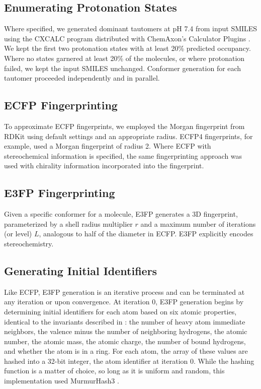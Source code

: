 \documentclass[../../main.tex]{subfiles}
\begin{document}
\begin{refsection}
	\subsection*{Enumerating Protonation States}

	Where specified, we generated dominant tautomers at pH 7.4 from input SMILES using the CXCALC program distributed with ChemAxon's Calculator Plugins \supercite{chemaxon_software_2015}.
	We kept the first two protonation states with at least 20\% predicted occupancy.
	Where no states garnered at least 20\% of the molecules, or where protonation failed, we kept the input SMILES unchanged.
	Conformer generation for each tautomer proceeded independently and in parallel.

	\subsection*{ECFP Fingerprinting}

	To approximate ECFP fingerprints, we employed the Morgan fingerprint from RDKit using default settings and an appropriate radius.
	ECFP4 fingerprints, for example, used a Morgan fingerprint of radius 2.
	Where ECFP with stereochemical information is specified, the same fingerprinting approach was used with chirality information incorporated into the fingerprint.

	\subsection*{E3FP Fingerprinting}

	Given a specific conformer for a molecule, E3FP generates a 3D fingerprint, parameterized by a shell radius multiplier $r$ and a maximum number of iterations (or level) $L$, analogous to half of the diameter in ECFP.
	E3FP explicitly encodes stereochemistry.

	\subsection*{Generating Initial Identifiers}

	Like ECFP, E3FP generation is an iterative process and can be terminated at any iteration or upon convergence.
	At iteration 0, E3FP generation begins by determining initial identifiers for each atom based on six atomic properties, identical to the invariants described in  \supercite{rogers_2010} : the number of heavy atom immediate neighbors, the valence minus the number of neighboring hydrogens, the atomic number, the atomic mass, the atomic charge, the number of bound hydrogens, and whether the atom is in a ring.
	For each atom, the array of these values are hashed into a 32-bit integer, the atom identifier at iteration 0.
	While the hashing function is a matter of choice, so long as it is uniform and random, this implementation used MurmurHash3  \supercite{appleby_website}.


\end{refsection}
\end{document}
